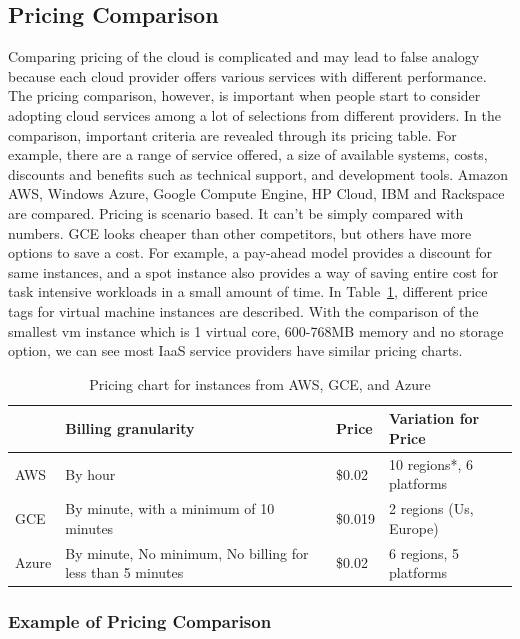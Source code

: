 \documentclass{sig-alternate}
\begin{document}
\subsection{Pricing Comparison}

Comparing pricing of the cloud is complicated and may lead to false analogy because each cloud provider offers various services with different performance. The pricing comparison, however, is important when people start to consider adopting cloud services among a lot of selections from different providers. In the comparison, important criteria are revealed through its pricing table. For example, there are a range of service offered, a size of available systems, costs, discounts and benefits such as technical support, and development tools. Amazon AWS, Windows Azure, Google Compute Engine, HP Cloud, IBM and Rackspace are compared. Pricing is scenario based. It can't be simply compared with numbers. GCE looks cheaper than other competitors, but others have more options to save a cost. For example, a pay-ahead model provides a discount for same instances, and a spot instance also provides a way of saving entire cost for task intensive workloads in a small amount of time. In Table~\ref{T:tab0}, different price tags for virtual machine instances are described. With the comparison of the smallest vm instance which is 1 virtual core, 600-768MB memory and no storage option, we can see most IaaS service providers have similar pricing charts.

\begin{table}[h!]
\caption{Pricing chart for instances from AWS, GCE, and Azure}\label{T:tab0}
\begin{tabular}{l|l|l|l}
     &	Billing granularity &	Price &	Variation for Price \\
  \hline
AWS &	By hour	& \$0.02 &	10 regions*, 6 platforms \\
GCE &	By minute, with a minimum of 10 minutes &	\$0.019  &	2 regions (Us, Europe) \\
Azure &	By minute, No minimum, No billing for less than 5 minutes & \$0.02 &	6 regions, 5 platforms \\
\end{tabular}
\end{table}

\subsubsection{Example of Pricing Comparison}
\end{document}
